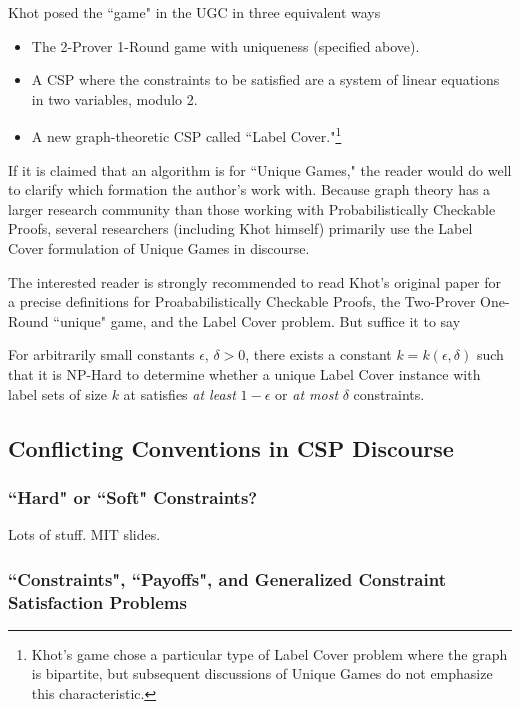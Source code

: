 Khot posed the ``game" in the UGC in three equivalent ways
\begin{itemize}
\item The 2-Prover 1-Round game with uniqueness (specified above).
\item A CSP where the constraints to be satisfied are a system of linear equations in two variables, modulo 2.
\item A new graph-theoretic CSP called ``Label Cover."\footnote{Khot's game chose a particular type of Label Cover problem where the graph is bipartite, but subsequent discussions of Unique Games do not emphasize this characteristic. }
\end{itemize}

If it is claimed that an algorithm is for ``Unique Games," the reader would do well to clarify which formation the author's work with. Because graph theory has a larger research community than those working with Probabilistically Checkable Proofs, several researchers (including Khot himself) primarily use the Label Cover formulation of Unique Games in discourse. 

The interested reader is strongly recommended to read Khot's original paper for a precise definitions for Proababilistically Checkable Proofs, the Two-Prover One-Round ``unique" game, and the Label Cover problem. But suffice it to say

\begin{ugc}
For arbitrarily small constants $\epsilon$, $\delta > 0$, there exists a constant $k = k(\epsilon,\delta)$ such that it is NP-Hard to determine whether a unique Label Cover instance with label sets of size $k$ at satisfies \textit{at least} $1-\epsilon$ or \textit{at most} $\delta$ constraints.
\end{ugc}

\subsection{Conflicting Conventions in CSP Discourse}

\subsubsection{``Hard" or ``Soft" Constraints?}
Lots of stuff\cite{Russell2009}.
MIT slides.

\subsubsection{``Constraints", ``Payoffs", and Generalized Constraint Satisfaction Problems}

